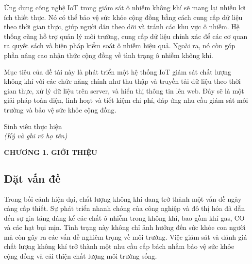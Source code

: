 \documentclass[12pt,a4paper]{article}
\begin{document}
Ứng dụng công nghệ IoT trong giám sát ô nhiễm không khí sẽ mang lại nhiều lợi ích thiết thực. Nó có thể bảo vệ sức khỏe cộng đồng bằng cách cung cấp dữ liệu theo thời gian thực, giúp người dân theo dõi và tránh các khu vực ô nhiễm. Hệ thống cũng hỗ trợ quản lý môi trường, cung cấp dữ liệu chính xác để các cơ quan ra quyết sách và biện pháp kiểm soát ô nhiễm hiệu quả. Ngoài ra, nó còn góp phần nâng cao nhận thức cộng đồng về tình trạng ô nhiễm không khí.

Mục tiêu của đề tài này là phát triển một hệ thống IoT giám sát chất lượng không khí với các chức năng chính như thu thập và truyền tải dữ liệu theo thời gian thực, xử lý dữ liệu trên server, và hiển thị thông tin lên web. Đây sẽ là một giải pháp toàn diện, linh hoạt và tiết kiệm chi phí, đáp ứng nhu cầu giám sát môi trường và bảo vệ sức khỏe cộng đồng.

\vspace{1.5cm}
\begin{flushright}
Sinh viên thực hiện\\
\textit{(Ký và ghi rõ họ tên)}
\end{flushright}

\newpage
\tableofcontents
\newpage

\listoffigures
{}
\newpage

\listoftables
{}
\newpage

\setcounter{section}{1}
\setcounter{subsection}{0}

\newpage
\begin{center}
    \textbf{\Large CHƯƠNG 1. GIỚI THIỆU}
\end{center}

\subsection{Đặt vấn đề}
Trong bối cảnh hiện đại, chất lượng không khí đang trở thành một vấn đề ngày càng cấp thiết. Sự phát triển nhanh chóng của công nghiệp và đô thị hóa đã dẫn đến sự gia tăng đáng kể các chất ô nhiễm trong không khí, bao gồm khí gas, CO và các hạt bụi mịn. Tình trạng này không chỉ ảnh hưởng đến sức khỏe con người mà còn gây ra các vấn đề nghiêm trọng về môi trường. Việc giám sát và đánh giá chất lượng không khí trở thành một nhu cầu cấp bách nhằm bảo vệ sức khỏe cộng đồng và cải thiện chất lượng môi trường sống.
\end{document}
